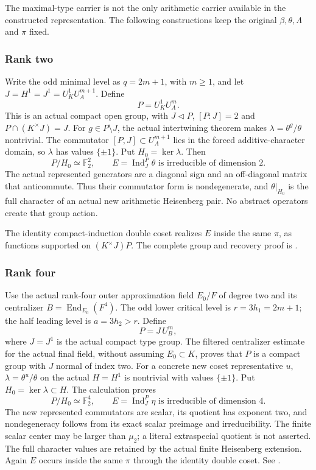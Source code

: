 The maximal-type carrier is not the only arithmetic carrier available in
the constructed representation. The following constructions keep the
original \(\beta,\theta,\Lambda\) and \(\pi\) fixed.

\hypertarget{dyadic_synthesis-rank-two}{%
\subsubsection{Rank two}\label{dyadic_synthesis-rank-two}}

Write the odd minimal level as \(q=2m+1\), with \(m\ge1\), and let
\(J=H^1=J^1=U_K^1U_A^{m+1}\). Define \[
P=U_K^1U_A^m.
\] This is an actual compact open group, with \(J\triangleleft P\),
\([P:J]=2\) and \(P\cap(K^\times J)=J\). For \(g\in P\setminus J\), the
actual intertwining theorem makes \(\lambda=\theta^g/\theta\)
nontrivial. The commutator \([P,J]\subset U_A^{m+1}\) lies in the forced
additive-character domain, so \(\lambda\) has values \(\{\pm1\}\). Put
\(H_0=\ker\lambda\). Then \[
P/H_0\simeq\mathbb F_2^2,\qquad
E=\operatorname{Ind}_J^P\theta\text{ is irreducible of dimension }2.
\] The actual represented generators are a diagonal sign and an
off-diagonal matrix that anticommute. Thus their commutator form is
nondegenerate, and \(\theta|_{H_0}\) is the full character of an actual
new arithmetic Heisenberg pair. No abstract operators create that group
action.

The identity compact-induction double coset realizes \(E\) inside the
same \(\pi\), as functions supported on \((K^\times J)P\). The complete
group and recovery proof is
.

\hypertarget{dyadic_synthesis-rank-four}{%
\subsubsection{Rank four}\label{dyadic_synthesis-rank-four}}

Use the actual rank-four outer approximation field \(E_0/F\) of degree
two and its centralizer \(B=\operatorname{End}_{E_0}(F^4)\). The odd
lower critical level is \(r=3h_1=2m+1\); the half leading level is
\(a=3h_2>r\). Define \[
P=J\,U_B^m,
\] where \(J=J^1\) is the actual compact type group. The filtered
centralizer estimate for the actual final field, without assuming
\(E_0\subset K\), proves that \(P\) is a compact group with \(J\) normal
of index two. For a concrete new coset representative \(u\),
\(\lambda=\theta^u/\theta\) on the actual \(H=H^1\) is nontrivial with
values \(\{\pm1\}\). Put \(H_0=\ker\lambda\subset H\). The calculation
proves \[
P/H_0\simeq\mathbb F_2^4,\qquad
E=\operatorname{Ind}_J^P\eta\text{ is irreducible of dimension }4.
\] The new represented commutators are scalar, its quotient has exponent
two, and nondegeneracy follows from its exact scalar preimage and
irreducibility. The finite scalar center may be larger than \(\mu_2\); a
literal extraspecial quotient is not asserted. The full character values
are retained by the actual finite Heisenberg extension. Again \(E\)
occurs inside the same \(\pi\) through the identity double coset. See
.

